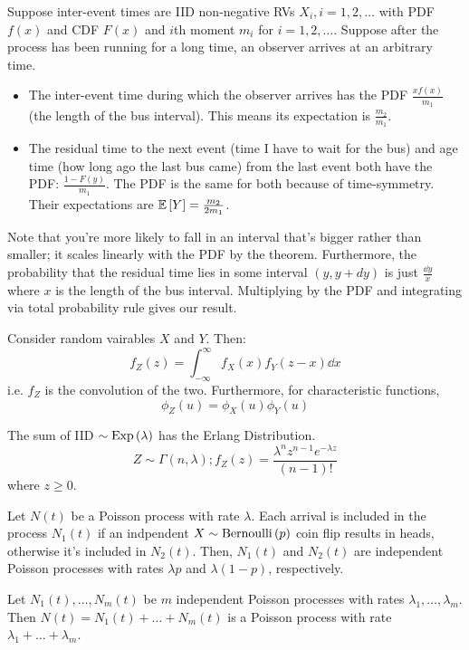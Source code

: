 \begin{theorem}
    Suppose inter-event times are IID non-negative RVs $X_i, i = 1, 2, \dots$ with PDF $f(x)$ and CDF $F(x)$ and $i$th moment $m_i$
    for $i = 1, 2, \dots$. Suppose after the process has been running for a long time, an observer arrives at an arbitrary time.
    \begin{itemize}
        \item The inter-event time during which the observer arrives has the PDF $\frac{xf(x)}{m_1}$ (the length of the bus interval). This means its expectation is $\frac{m_2}{m_1}$.
        
        \item The residual time to the next event (time I have to wait for the bus) and age time
        (how long ago the last bus came) from the last event both have the PDF:
        $\frac{1 - F(y)}{m_1}$.
        The PDF is the same for both because of time-symmetry. Their expectations are $\mathbb{E}\left[ Y \right] = \frac{m_2}{2 m_1}$.
    \end{itemize}

    Note that you're more likely to fall in an interval that's bigger rather than smaller; it scales linearly with the PDF by the theorem.
    Furthermore, the probability that the residual time lies in some interval $(y, y + dy)$ is just $\frac{\dd{y}}{x}$ where $x$ is the length of the bus interval.
    Multiplying by the PDF and integrating via total probability rule gives our result.
\end{theorem}

\begin{theorem}
    Consider random vairables $X$ and $Y$. Then:
    \[ f_Z(z) = \int_{-\infty}^{\infty} f_X(x) f_Y(z - x) \dd{x} \]
    i.e. $f_Z$ is the convolution of the two. Furthermore, for characteristic functions,
    \[ \phi_Z(u) = \phi_X(u) \phi_Y(u) \]
\end{theorem}

\begin{theorem}
    The sum of IID $\Expo{\empty}{\lambda}$ has the Erlang Distribution.
    \[ Z \sim \Gamma(n, \lambda); f_Z(z) = \frac{\lambda^n z^{n - 1} e^{-\lambda z}}{(n - 1)!} \]
    where $z \geq 0$.
\end{theorem}

\begin{theorem}
    Let $N(t)$ be a Poisson process with rate $\lambda$. Each arrival is included in the process $N_1(t)$ if an indpendent $X \sim \text{Bernoulli}\left( p \right)$ coin flip results in heads,
    otherwise it's included in $N_2(t)$. Then, $N_1(t)$ and $N_2(t)$ are independent Poisson processes with rates $\lambda p$ and $\lambda ( 1- p)$, respectively.
\end{theorem}

\begin{theorem}
    Let $N_1(t), \dots, N_m(t)$ be $m$ independent Poisson processes with rates $\lambda_1, \dots, \lambda_m$.
    Then $N(t) = N_1(t) + \dots + N_m(t)$ is a Poisson process with rate $\lambda_1 + \dots + \lambda_m$.
\end{theorem}